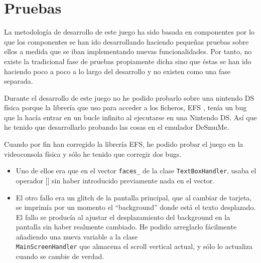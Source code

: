 

\chapter{Pruebas}
\label{chap:pruebas}
La metodología de desarrollo de este juego ha sido basada en
componentes por lo que los componentes se han ido desarrollando
haciendo pequeñas pruebas sobre ellos a medida que se iban
implementando nuevas funcionalidades. Por tanto, no existe la
tradicional fase de pruebas propiamente dicha sino que éstas se han
ido haciendo poco a poco a lo largo del desarrollo y no existen como
una fase separada.

Durante el desarrollo de este juego no he podido probarlo sobre una
nintendo DS física porque la librería que uso para acceder a los
ficheros, EFS \cite{website:efslib}, tenía un bug que la hacía entrar
en un bucle infinito al ejecutarse en una Nintendo DS. Así que he
tenido que desarrollarlo probando las cosas en el emulador DeSmuMe.

Cuando por fin han corregido la librería EFS, he podido probar el
juego en la videoconsola física y sólo he tenido que corregir dos
bugs.

\begin{itemize}
\item
Uno de ellos era que en el vector \texttt{faces\_} de la clase
\texttt{TextBoxHandler}, usaba el operador [] sin haber introducido
previamente nada en el vector.

\item
El otro fallo era un glitch de la pantalla principal, que al cambiar
de tarjeta, se imprimía por un momento el ``background'' donde está el
texto desplazado.\\
El fallo se producía al ajustar el desplazamiento del background en la
pantalla sin haber realmente cambiado. He podido arreglarlo fácilmente
añadiendo una nueva variable a la clase\\
\texttt{MainScreenHandler} que almacena el scroll vertical actual, y
sólo lo actualiza cuando se cambie de verdad.
\end{itemize}

